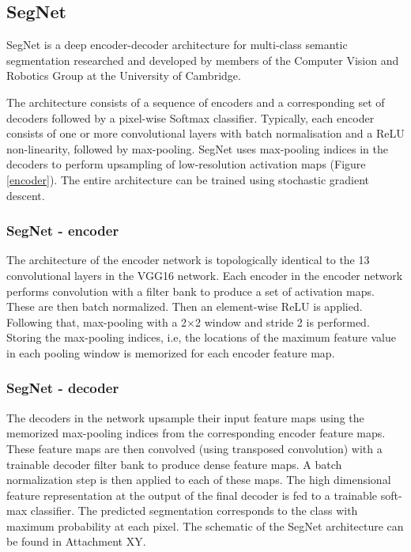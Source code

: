 \newpage
\subsection{SegNet}

SegNet is a deep encoder-decoder architecture for multi-class semantic segmentation researched and developed by members of the Computer Vision and Robotics Group at the University of Cambridge. \cite{segnet_tut}

The architecture consists of a sequence of encoders and a corresponding set of decoders followed by a pixel-wise Softmax classifier. Typically, each encoder consists of one or more convolutional layers with batch normalisation and a ReLU non-linearity, followed by max-pooling. SegNet uses max-pooling indices in the decoders to perform upsampling of low-resolution activation maps (Figure \ref{encoder}). The entire architecture can be trained using stochastic gradient descent. \cite{segnet_tut}

\subsubsection{SegNet - encoder}

The architecture of the encoder network is topologically identical to the 13 convolutional layers in the VGG16 network. Each encoder in the encoder network performs convolution with a filter bank to produce a set of activation maps. These are then batch normalized. Then an element-wise ReLU is applied. Following that, max-pooling with a 2×2 window and stride 2 is performed. Storing the max-pooling indices, i.e, the locations of the maximum feature value in each pooling window is memorized for each encoder feature map. \cite{segnet}

\subsubsection{SegNet - decoder}

The decoders in the network upsample their input feature maps using the memorized max-pooling indices from the corresponding encoder feature maps. These feature maps are then convolved (using transposed convolution) with a trainable decoder filter bank to produce dense feature maps. A batch normalization step is then applied to each of these maps. The high dimensional feature representation at the output of the final decoder is fed to a trainable soft-max classifier. The predicted segmentation corresponds to the class with maximum probability at each pixel. \cite{segnet} The schematic of the SegNet architecture can be found in Attachment XY.

